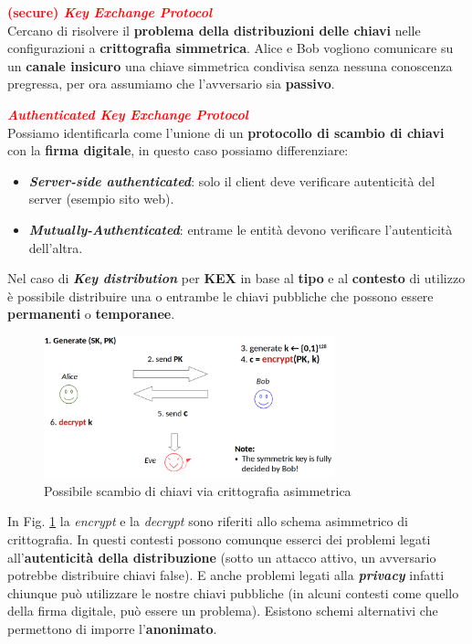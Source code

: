 \begin{flushleft}
    \medskip

    \textcolor{red}{\textbf{(secure) \textit{Key Exchange Protocol}}} \\
    Cercano di risolvere il \textbf{problema della distribuzioni delle chiavi} nelle configurazioni a \textbf{crittografia simmetrica}. Alice e Bob vogliono comunicare su un \textbf{canale insicuro} una chiave simmetrica condivisa senza nessuna conoscenza pregressa, per ora assumiamo che l'avversario sia \textbf{passivo}.
    
    \newpage

    \textcolor{red}{\textbf{\textit{Authenticated Key Exchange Protocol}}} \\
    Possiamo identificarla come l'unione di un \textbf{protocollo di scambio di chiavi} con la \textbf{firma digitale}, in questo caso possiamo differenziare:
    \begin{itemize}[nosep]
        \item \textbf{\textit{Server-side authenticated}}: solo il client deve verificare autenticità del server (esempio sito web).
        \item \textbf{\textit{Mutually-Authenticated}}: entrame le entità devono verificare l'autenticità dell'altra.
    \end{itemize}
    Nel caso di \textbf{\textit{Key distribution}} per \textbf{KEX} in base al \textbf{tipo} e al \textbf{contesto} di utilizzo è possibile distribuire una o entrambe le chiavi pubbliche che possono essere \textbf{permanenti} o \textbf{temporanee}.

    \begin{figure}[h]
        \centering
        \includegraphics[width=0.75\textwidth]{img/kex.png}
        \caption{Possibile scambio di chiavi via crittografia asimmetrica}
        \label{fig:kex}
    \end{figure}

    In Fig. \ref{fig:kex} la \textit{encrypt} e la \textit{decrypt} sono riferiti allo schema asimmetrico di crittografia. In questi contesti possono comunque esserci dei problemi legati all'\textbf{autenticità della distribuzione} (sotto un attacco attivo, un avversario potrebbe distribuire chiavi false). E anche problemi legati alla \textbf{\textit{privacy}} infatti chiunque può utilizzare le nostre chiavi pubbliche (in alcuni contesti come quello della firma digitale, può essere un problema). Esistono schemi alternativi che permettono di imporre l'\textbf{anonimato}.
    
\end{flushleft}

